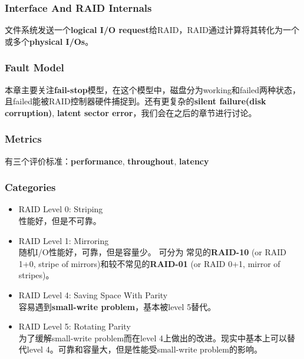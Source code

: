 \documentclass{article}
\begin{document}
\subsubsection{Interface And RAID Internals}
文件系统发送一个\textbf{logical I/O request}给RAID，RAID通过计算将其转化为一个或多个\textbf{physical I/Os}。
\subsubsection{Fault Model}
本章主要关注\textbf{fail-stop}模型，在这个模型中，磁盘分为working和failed两种状态，且failed能被RAID控制器硬件捕捉到。还有更复杂的\textbf{silent failure(disk corruption)}, \textbf{latent sector error}，我们会在之后的章节进行讨论。
\subsubsection{Metrics}
有三个评价标准：\textbf{performance}, \textbf{throughout}, \textbf{latency}
\subsubsection{Categories}
\begin{itemize}
    \item RAID Level 0: Striping \\
    性能好，但是不可靠。
    \item RAID Level 1: Mirroring \\
    随机I/O性能好，可靠，但是容量少。
    可分为 常见的\textbf{RAID-10} (or RAID 1+0, stripe of mirrors)和较不常见的\textbf{RAID-01} (or RAID 0+1, mirror of stripes)。
    \item RAID Level 4: Saving Space With Parity \\
    容易遇到\textbf{small-write problem}，基本被level 5替代。
    \item RAID Level 5: Rotating Parity \\
    为了缓解small-write problem而在level 4上做出的改进。现实中基本上可以替代level 4。可靠和容量大，但是性能受small-write problem的影响。
\end{itemize}
\end{document}
